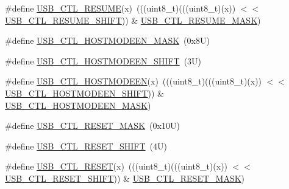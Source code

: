 \begin{DoxyCompactItemize}
\item 
\#define \mbox{\hyperlink{group___u_s_b___register___masks_gabf5ce133606d0539b886b04537646d7d}{U\+S\+B\+\_\+\+C\+T\+L\+\_\+\+R\+E\+S\+U\+ME}}(x)~(((uint8\+\_\+t)(((uint8\+\_\+t)(x)) $<$$<$ \mbox{\hyperlink{group___u_s_b___register___masks_gab8354dafb3b0cb438770fe60ffec4714}{U\+S\+B\+\_\+\+C\+T\+L\+\_\+\+R\+E\+S\+U\+M\+E\+\_\+\+S\+H\+I\+FT}})) \& \mbox{\hyperlink{group___u_s_b___register___masks_ga4e385fa5cf2157ef30a39c1c2b766cd3}{U\+S\+B\+\_\+\+C\+T\+L\+\_\+\+R\+E\+S\+U\+M\+E\+\_\+\+M\+A\+SK}})
\item 
\#define \mbox{\hyperlink{group___u_s_b___register___masks_gaddf09c4e93070675c5c93c711518250c}{U\+S\+B\+\_\+\+C\+T\+L\+\_\+\+H\+O\+S\+T\+M\+O\+D\+E\+E\+N\+\_\+\+M\+A\+SK}}~(0x8\+U)
\item 
\#define \mbox{\hyperlink{group___u_s_b___register___masks_ga87a32a06006794e2dd638fd2bb2eb788}{U\+S\+B\+\_\+\+C\+T\+L\+\_\+\+H\+O\+S\+T\+M\+O\+D\+E\+E\+N\+\_\+\+S\+H\+I\+FT}}~(3\+U)
\item 
\#define \mbox{\hyperlink{group___u_s_b___register___masks_ga4236cc68486374d9bf70856c528d90d2}{U\+S\+B\+\_\+\+C\+T\+L\+\_\+\+H\+O\+S\+T\+M\+O\+D\+E\+EN}}(x)~(((uint8\+\_\+t)(((uint8\+\_\+t)(x)) $<$$<$ \mbox{\hyperlink{group___u_s_b___register___masks_ga87a32a06006794e2dd638fd2bb2eb788}{U\+S\+B\+\_\+\+C\+T\+L\+\_\+\+H\+O\+S\+T\+M\+O\+D\+E\+E\+N\+\_\+\+S\+H\+I\+FT}})) \& \mbox{\hyperlink{group___u_s_b___register___masks_gaddf09c4e93070675c5c93c711518250c}{U\+S\+B\+\_\+\+C\+T\+L\+\_\+\+H\+O\+S\+T\+M\+O\+D\+E\+E\+N\+\_\+\+M\+A\+SK}})
\item 
\#define \mbox{\hyperlink{group___u_s_b___register___masks_ga6e3734900ace59f3dedf7a8f246721d7}{U\+S\+B\+\_\+\+C\+T\+L\+\_\+\+R\+E\+S\+E\+T\+\_\+\+M\+A\+SK}}~(0x10\+U)
\item 
\#define \mbox{\hyperlink{group___u_s_b___register___masks_gac709cb60252fd6ab2775785ffc2953e6}{U\+S\+B\+\_\+\+C\+T\+L\+\_\+\+R\+E\+S\+E\+T\+\_\+\+S\+H\+I\+FT}}~(4\+U)
\item 
\#define \mbox{\hyperlink{group___u_s_b___register___masks_ga1a419c2524f4084d8ce1fc4bf8bebb5f}{U\+S\+B\+\_\+\+C\+T\+L\+\_\+\+R\+E\+S\+ET}}(x)~(((uint8\+\_\+t)(((uint8\+\_\+t)(x)) $<$$<$ \mbox{\hyperlink{group___u_s_b___register___masks_gac709cb60252fd6ab2775785ffc2953e6}{U\+S\+B\+\_\+\+C\+T\+L\+\_\+\+R\+E\+S\+E\+T\+\_\+\+S\+H\+I\+FT}})) \& \mbox{\hyperlink{group___u_s_b___register___masks_ga6e3734900ace59f3dedf7a8f246721d7}{U\+S\+B\+\_\+\+C\+T\+L\+\_\+\+R\+E\+S\+E\+T\+\_\+\+M\+A\+SK}})
\item 
$$
\end{DoxyCompactItemize}
